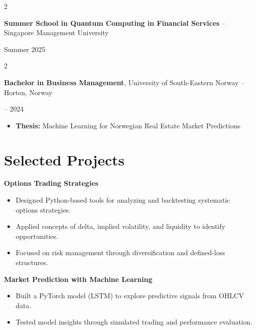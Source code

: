 \documentclass[10pt, letterpaper]{article}
\newenvironment{highlights}{
    \begin{itemize}[
        topsep=0.1 cm, parsep=0.1 cm, partopsep=0pt,
        itemsep=0.05 cm, %
        leftmargin=0 cm
    ]
}{
    \end{itemize}
}
\newenvironment{onecolentry}{\par\addvspace{0.1cm}}{\par\addvspace{0.1cm}}
\newenvironment{twocolentry}[2][]{
    \def\secondColumn{#2}
    \setcolumnwidth{\fill, 4.5 cm}
    \begin{paracol}{2}
}{
    \switchcolumn \raggedleft \secondColumn
    \end{paracol}
}
\begin{document}
\vspace{0.2 cm}

\begin{twocolentry}{Summer 2025}
    \textbf{Summer School in Quantum Computing in Financial Services} -- Singapore Management University
\end{twocolentry}

\vspace{0.2 cm}

\begin{twocolentry}{2021 -- 2024}
    \textbf{Bachelor in Business Management}, University of South-Eastern Norway -- Horten, Norway
\end{twocolentry}
\begin{onecolentry}
    \begin{highlights}
    \setlength\itemindent{2em}
        \item \textbf{Thesis:} Machine Learning for Norwegian Real Estate Market Predictions
    \end{highlights}
\end{onecolentry}

\section{Selected Projects}
\begin{onecolentry}
    \textbf{Options Trading Strategies}
\end{onecolentry}
\begin{onecolentry}
    \begin{highlights}
    \setlength\itemindent{2em}
        \item Designed Python-based tools for analyzing and backtesting systematic options strategies. 
        \item Applied concepts of delta, implied volatility, and liquidity to identify opportunities. 
        \item Focused on risk management through diversification and defined-loss structures. 
    \end{highlights}
\end{onecolentry}

\vspace{0.2 cm}

\begin{onecolentry}
    \textbf{Market Prediction with Machine Learning}
\end{onecolentry}
\begin{onecolentry}
    \begin{highlights}
    \setlength\itemindent{2em}
        \item Built a PyTorch model (LSTM) to explore predictive signals from OHLCV data. 
        \item Tested model insights through simulated trading and performance evaluation. 
    \end{highlights}
\end{onecolentry}
\end{document}
